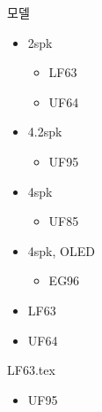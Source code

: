 \documentclass{beamer}
\begin{document}



\begin{frame}[t]{모델}
\tableofcontents
\huge	
\begin{itemize}
\huge \item 2spk
	\begin{itemize}
	\large \item LF63
	\large \item UF64
	\end{itemize}
\huge \item 4.2spk
	\begin{itemize}
	\large \item UF95
	\end{itemize}
\huge \item 4spk
	\begin{itemize}
	\large \item UF85
	\end{itemize}
\huge \item 4spk, OLED
	\begin{itemize}
	\large \item EG96
	\end{itemize}			
\end{itemize}
\end{frame}





\begin{frame}[t]{}
\tableofcontents
\huge
\begin{itemize}
\huge \item LF63
\huge \item UF64
\end{itemize}
\end{frame}

{LF63.tex}


\begin{frame}[t]{}
\tableofcontents
\huge
\begin{itemize}
\huge \item UF95
\end{itemize}
\end{frame}
\end{document}
